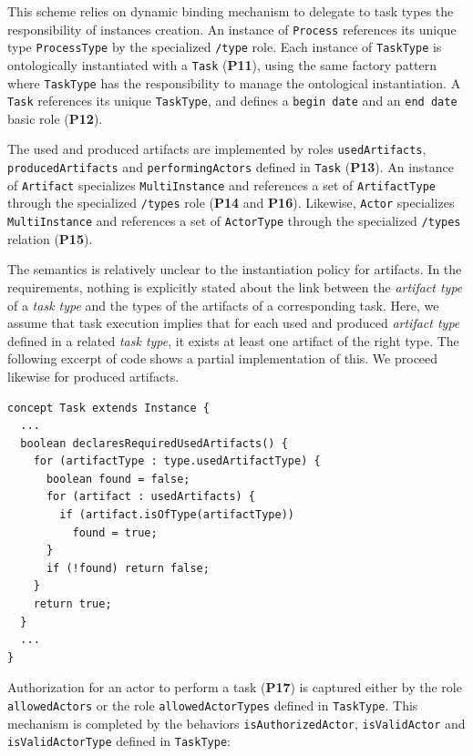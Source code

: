 This scheme relies on \FML dynamic binding mechanism to delegate to task types
the responsibility of instances creation. An instance of \texttt{Process}
references its unique type \texttt{ProcessType} by the specialized
\texttt{/type} role. Each instance of \texttt{TaskType} is ontologically
instantiated with a \texttt{Task} (\textbf{P11}), using the same factory
pattern where \texttt{TaskType} has the responsibility to manage the
ontological instantiation. A \texttt{Task} references its unique
\texttt{TaskType}, and defines a \texttt{begin date} and an \texttt{end date}
basic role (\textbf{P12}).

The used and produced artifacts are implemented by roles
\texttt{usedArtifacts}, \texttt{producedArtifacts} and
\texttt{performingActors} defined in \texttt{Task} (\textbf{P13}). An instance
of \texttt{Artifact} specializes \texttt{MultiInstance} and references a set of
\texttt{ArtifactType} through the specialized \texttt{/types} role
(\textbf{P14} and \textbf{P16}). Likewise, \texttt{Actor} specializes
\texttt{MultiInstance} and references a set of \texttt{ActorType} through the
specialized \texttt{/types} relation (\textbf{P15}).

The semantics is relatively unclear to the instantiation policy for artifacts.
In the requirements, nothing is explicitly stated about the link between the
\emph{artifact type} of a \emph{task type} and the types of the artifacts of a
corresponding task.  Here, we assume that task execution implies that for each
used and produced \emph{artifact type} defined in a related \emph{task type},
it exists at least one artifact of the right type. The following excerpt of
\FML code shows a partial implementation of this. We proceed likewise for
produced artifacts.

\begin{lstlisting}
concept Task extends Instance {
  ...
  boolean declaresRequiredUsedArtifacts() {
    for (artifactType : type.usedArtifactType) {
      boolean found = false;
      for (artifact : usedArtifacts) {
        if (artifact.isOfType(artifactType))
          found = true;
      }
      if (!found) return false;
    }
    return true;
  }
  ...
}
\end{lstlisting}

Authorization for an actor to perform a task (\textbf{P17}) is captured either
by the role \texttt{allowedActors} or the role \texttt{allowedActorTypes}
defined in \texttt{TaskType}. This mechanism is completed by the behaviors
\texttt{isAuthorizedActor}, \texttt{isValidActor} and \texttt{isValidActorType}
defined in \texttt{TaskType}:

